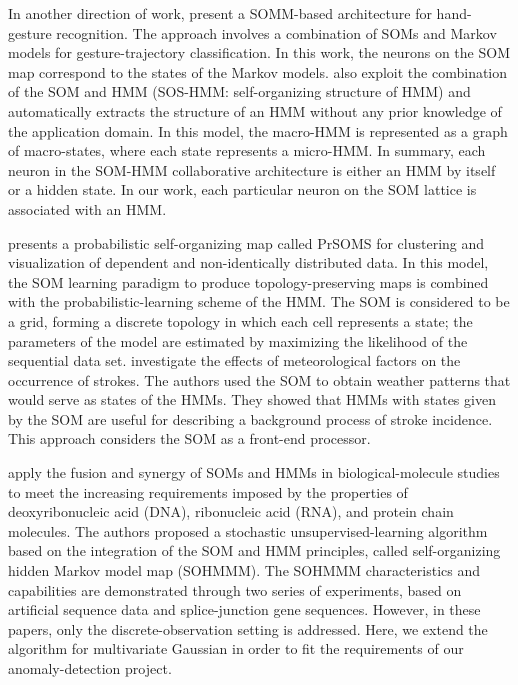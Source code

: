 In another direction of work, \citet{Caridakis2010} present a SOMM-based architecture for hand-gesture recognition. The approach involves a combination of SOMs and Markov models for gesture-trajectory classification. In this work, the neurons on the SOM map correspond to the states of the Markov models. \citet{Jaziri2011} also exploit the combination of the SOM and HMM (SOS-HMM: self-organizing structure of HMM) and automatically extracts the structure of an HMM without any prior knowledge of the application domain. In this model, the macro-HMM is represented as a graph of macro-states, where each state represents a micro-HMM. In summary, each neuron in the SOM-HMM collaborative architecture is either an HMM by itself or a hidden state. In our work, each particular neuron on the SOM lattice is associated with an HMM. 

\citet{Lebbah2015} presents a probabilistic self-organizing map called PrSOMS for clustering and visualization of dependent and non-identically distributed data. In this model, the SOM learning paradigm to produce topology-preserving maps is combined with the probabilistic-learning scheme of the HMM. The SOM is considered to be a grid, forming a discrete topology in which each cell represents a state; the parameters of the model are estimated by maximizing the likelihood of the sequential data set. \citet{Morimoto2016} investigate the effects of meteorological factors on the occurrence of strokes. The authors used the SOM to obtain weather patterns that would serve as states of the HMMs. They showed that HMMs with states given by the SOM are useful for describing a background process of stroke incidence. This approach considers the SOM as a front-end processor.

\citet{Ferles2008,Ferles2013,Ferles2017} apply the fusion and synergy of SOMs and HMMs in biological-molecule studies to meet the increasing requirements imposed by the properties of deoxyribonucleic acid (DNA), ribonucleic acid (RNA), and protein chain molecules. The authors proposed a stochastic unsupervised-learning algorithm based on the integration of the SOM and HMM principles, called self-organizing hidden Markov model map (SOHMMM). The SOHMMM characteristics and capabilities are demonstrated through two series of experiments, based on artificial sequence data and splice-junction gene sequences. However, in these papers, only the discrete-observation setting is addressed. Here, we extend the algorithm for multivariate Gaussian in order to fit the requirements of our anomaly-detection project.

